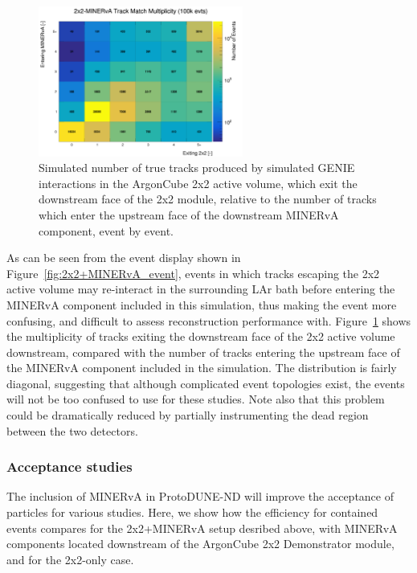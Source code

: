 \begin{figure}[htb]
  \centering
  \includegraphics[width=0.6\textwidth]{plots/2x2_minerva_plots/track_mathch_topo.png}
  \caption{Simulated number of true tracks produced by simulated GENIE interactions in the ArgonCube 2x2 active volume, which exit the downstream face of the 2x2 module, relative to the number of tracks which enter the upstream face of the downstream MINERvA component, event by event.}
  \label{fig:track_multiplicity_topo}
\end{figure}
As can be seen from the event display shown in Figure~\ref{fig:2x2+MINERvA_event}, events in which tracks escaping the 2x2 active volume may re-interact in the surrounding LAr bath before entering the MINERvA component included in this simulation, thus making the event more confusing, and difficult to assess reconstruction performance with. Figure~\ref{fig:track_multiplicity_topo} shows the multiplicity of tracks exiting the downstream face of the 2x2 active volume downstream, compared with the number of tracks entering the upstream face of the MINERvA component included in the simulation. The distribution is fairly diagonal, suggesting that although complicated event topologies exist, the events will not be too confused to use for these studies. Note also that this problem could be dramatically reduced by partially instrumenting the dead region between the two detectors.

\subsubsection{Acceptance studies}
\label{sec:minerva-acceptance}
The inclusion of MINERvA in ProtoDUNE-ND will improve the acceptance of particles for various studies. Here, we show how the efficiency for contained events compares for the 2x2+MINERvA setup desribed above, with MINERvA components located downstream of the ArgonCube 2x2 Demonstrator module, and for the 2x2-only case.

